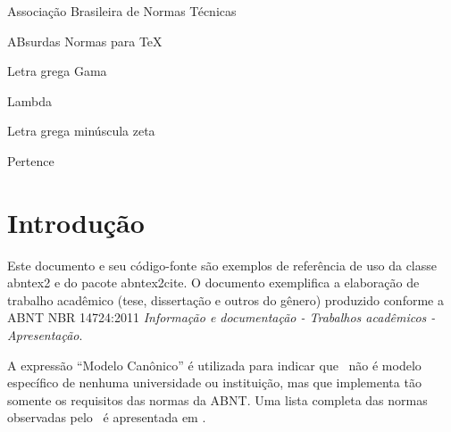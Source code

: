 \documentclass[
	12pt,				%
	openright,			%
	twoside,			%
	a4paper,			%
	english,			%
	french,				%
	spanish,			%
	brazil				%
	]{abntex2}
\begin{document}
\listoftables*
\cleardoublepage

\begin{siglas}
  \item[ABNT] Associação Brasileira de Normas Técnicas
  \item[abnTeX] ABsurdas Normas para TeX
\end{siglas}

\begin{simbolos}
  \item[$ \Gamma $] Letra grega Gama
  \item[$ \Lambda $] Lambda
  \item[$ \zeta $] Letra grega minúscula zeta
  \item[$ \in $] Pertence
\end{simbolos}

\tableofcontents*
\cleardoublepage



\textual

\chapter{Introdução}

Este documento e seu código-fonte são exemplos de referência de uso da classe
\textsf{abntex2} e do pacote \textsf{abntex2cite}. O documento 
exemplifica a elaboração de trabalho acadêmico (tese, dissertação e outros do
gênero) produzido conforme a ABNT NBR 14724:2011 \emph{Informação e documentação
- Trabalhos acadêmicos - Apresentação}.

A expressão ``Modelo Canônico'' é utilizada para indicar que \abnTeX\ não é
modelo específico de nenhuma universidade ou instituição, mas que implementa tão
somente os requisitos das normas da ABNT. Uma lista completa das normas
observadas pelo \abnTeX\ é apresentada em .
\end{document}
